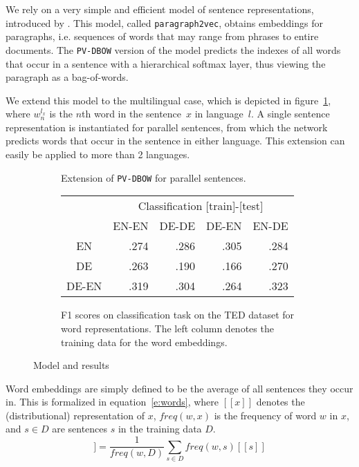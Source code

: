 \documentclass[a4paper,11pt]{article}
\begin{document}
We rely on a very simple and efficient model of sentence representations, introduced by \cite{le2014distributed}.
This model, called {\tt paragraph2vec}, obtains embeddings for paragraphs, i.e. sequences of words that may range from phrases  to entire documents. The {\tt PV-DBOW} version of the model predicts the indexes of all words that occur in a sentence with a hierarchical softmax layer, thus viewing the paragraph as a bag-of-words. 

We extend this model to the multilingual case, which is depicted in figure~\ref{f:model}, where $w_n^{l_x}$ is the $n$th word in the sentence~$x$ in language~$l$. A single sentence representation is instantiated for parallel sentences, from which the network predicts words that occur in the sentence in either language. This extension can easily be applied to more than 2 languages.%

\begin{figure}\center
\begin{subfigure}{.49\linewidth}
\center

\caption{Extension of {\tt PV-DBOW} for parallel sentences.}
\label{f:model}
\end{subfigure}
\begin{subfigure}{.49\linewidth}
\flushright
\begin{tabular}{c | r r r r }
&	\multicolumn{4}{c}{Classification [train]-[test]}	\\
&EN-EN	&DE-DE	&DE-EN	&EN-DE		\\\hline
EN			&.274		&.286		&.305		&.284		\\
DE			&.263		&.190		&.166		&.270		\\
DE-EN			&.319		&.304		&.264		&.323		\\
\end{tabular}
\caption{F1 scores on classification task on the TED dataset for word representations. The left column denotes the training data for the word embeddings.}
\label{t:dbow_mono_bi}
\end{subfigure}
\caption{Model and results}
\end{figure}


Word embeddings are simply defined to be the average of all sentences they occur in. This is  formalized in equation~\ref{e:words}, where $[\![ x ]\!]$ denotes the (distributional) representation of $x$, $freq(w,x)$ is the frequency of word $w$ in $x$, and $s\in D$ are sentences $s$ in the training data $D$.
\begin{equation}
[\![ w ]\!] =\frac{1}{freq(w,D)}\sum_{s\in D}freq(w,s) [\![ s ]\!]
\label{e:words}
\end{equation}
\end{document}
